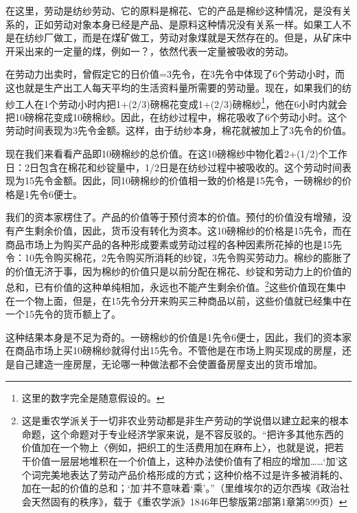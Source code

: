 \documentclass{ctexbook}
\begin{document}
    在这里，劳动是纺纱劳动、它的原料是棉花、它的产品是棉纱这种情况，是没有关系的，正如劳动对象本身已经是产品、是原料这种情况没有关系一样。如果工人不是在纺纱厂做工，而是在煤矿做工，劳动对象煤就是天然存在的。但是，从矿床中开采出来的一定量的煤，例如一？，依然代表一定量被吸收的劳动。
    
    在劳动力出卖时，曾假定它的日价值=3先令，在3先令中体现了6个劳动小时，而这也就是生产出工人每天平均的生活资料量所需要的劳动量。现在，如果我们的纺纱工人在1个劳动小时内把1+(2/3)磅棉花变成1+(2/3)磅棉纱\footnote{这里的数字完全是随意假设的。}，他在6小时内就会把10磅棉花变成10磅棉纱。因此，在纺纱过程中，棉花吸收了6个劳动小时。这个劳动时间表现为3先令金额。这样，由于纺纱本身，棉花就被加上了3先令的价值。
    
    现在我们来看看产品即10磅棉纱的总价值。在这10磅棉纱中物化着2+(1/2)个工作日：2日包含在棉花和纱锭量中，1/2日是在纺纱过程中被吸收的。这个劳动时间表现为15先令金额。因此，同10磅棉纱的价值相一致的价格是15先令，一磅棉纱的价格是1先令6便士。
    
    我们的资本家楞住了。产品的价值等于预付资本的价值。预付的价值没有增殖，没有产生剩余价值，因此，货币没有转化为资本。这10磅棉纱的价格是15先令，而在商品市场上为购买产品的各种形成要素或劳动过程的各种因素所花掉的也是15先令：10先令购买棉花，2先令购买所消耗的纱锭，3先令购买劳动力。棉纱的膨胀了的价值无济于事，因为棉纱的价值只是以前分配在棉花、纱锭和劳动力上的价值的总和，已有价值的这种单纯相加，永远也不能产生剩余价值。\footnote{这是重农学派关于一切非农业劳动都是非生产劳动的学说借以建立起来的根本命题，这个命题对于专业经济学家来说，是不容反驳的。“把许多其他东西的价值加在一个物上〈例如，把织工的生活费用加在麻布上〉，也就是说，把若干价值一层层地堆积在一个价值上，这种办法使价值有了相应的增加……‘加’这个词完美地表达了劳动产品价格形成的方式；这种价格不过是许多被消耗的、加在一起的价值的总和；‘加’并不意味着‘乘’。”（里维埃尔的迈尔西埃《政治社会天然固有的秩序》，载于《重农学派》1846年巴黎版第2部第1章第599页）}这些价值现在集中在一个物上面，但是，在15先令分开来购买三种商品以前，这些价值就已经集中在一个15先令的货币额上了。
    
    这种结果本身是不足为奇的。一磅棉纱的价值是1先令6便士，因此，我们的资本家在商品市场上买10磅棉纱就得付出15先令。不管他是在市场上购买现成的房屋，还是自己建造一座房屋，无论哪一种做法都不会使置备房屋支出的货币增加。
    
\end{document}
